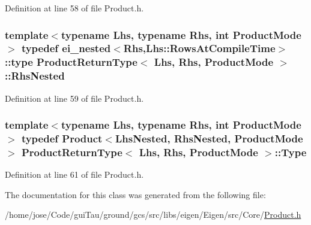 Definition at line 58 of file Product.\-h.

\hypertarget{struct_product_return_type_a4a48c2b37c66d1492db14945a01b5338}{
\subsubsection[{Rhs\-Nested}]{\setlength{\rightskip}{0pt plus 5cm}template$<$typename Lhs, typename Rhs, int Product\-Mode$>$ typedef {\bf ei\-\_\-nested}$<$Rhs,Lhs\-::\-Rows\-At\-Compile\-Time$>$\-::{\bf type} {\bf Product\-Return\-Type}$<$ Lhs, Rhs, Product\-Mode $>$\-::{\bf Rhs\-Nested}}}\label{struct_product_return_type_a4a48c2b37c66d1492db14945a01b5338}


Definition at line 59 of file Product.\-h.

\hypertarget{struct_product_return_type_a3a7733c6fd9c465f7fa5d09f53fe35e6}{
\subsubsection[{Type}]{\setlength{\rightskip}{0pt plus 5cm}template$<$typename Lhs, typename Rhs, int Product\-Mode$>$ typedef {\bf Product}$<${\bf Lhs\-Nested}, {\bf Rhs\-Nested}, Product\-Mode$>$ {\bf Product\-Return\-Type}$<$ Lhs, Rhs, Product\-Mode $>$\-::{\bf Type}}}\label{struct_product_return_type_a3a7733c6fd9c465f7fa5d09f53fe35e6}


Definition at line 61 of file Product.\-h.



The documentation for this class was generated from the following file\-:\begin{DoxyCompactItemize}
\item 
/home/jose/\-Code/gui\-Tau/ground/gcs/src/libs/eigen/\-Eigen/src/\-Core/\hyperlink{_product_8h}{Product.\-h}\end{DoxyCompactItemize}
